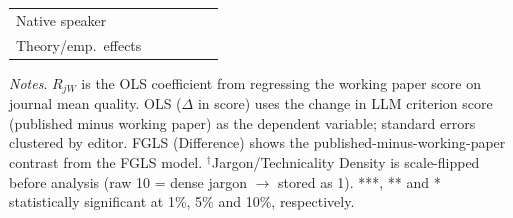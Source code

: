 \begin{table}[H]
\begin{threeparttable}
\begin{tabular}{p{4.5cm}S@{}S@{}S@{}S@{}S@{}}
            Native speaker                &               &           {}   &               &               &               \\
            Theory/emp.\ effects          &               &           {}   &               &               &               \\
            \bottomrule
        \end{tabular}
        \begin{tablenotes}
            \tiny
            \item \textit{Notes}. $R_{jW}$ is the OLS coefficient from regressing the working paper score on journal mean quality. OLS ($\Delta$ in score) uses the change in LLM criterion score (published minus working paper) as the dependent variable; standard errors clustered by editor. FGLS (Difference) shows the published-minus-working-paper contrast from the FGLS model. \(^\dagger\)Jargon/Technicality Density is scale-flipped before analysis (raw 10 = dense jargon $\rightarrow$ stored as 1). ***, ** and * statistically significant at 1\%, 5\% and 10\%, respectively.
        \end{tablenotes}
    \end{threeparttable}
\end{table}
